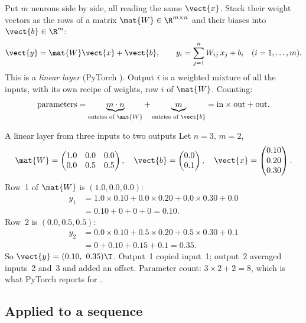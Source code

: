 Put $m$ neurons side by side, all reading the same $\vect{x}$. Stack their weight vectors as the rows
of a matrix $\mat{W}\in\R^{m\times n}$ and their biases into $\vect{b}\in\R^{m}$:
\begin{equation}\label{eq:shapes:linear}
\vect{y} = \mat{W}\vect{x} + \vect{b},\qquad
y_i = \sum_{j=1}^{n} W_{ij}\,x_j + b_i \quad (i = 1,\dots,m).
\end{equation}
This is a \emph{linear layer} (PyTorch ). Output $i$ is a
weighted mixture of all the inputs, with its own recipe of weights, row $i$ of $\mat{W}$. Counting:
\begin{equation}\label{eq:shapes:linearcount}
\text{parameters} = \underbrace{m\cdot n}_{\text{entries of } \mat{W}} + \underbrace{m}_{\text{entries of } \vect{b}}
= \text{in}\times\text{out} + \text{out}.
\end{equation}

\begin{worked}[label={we:shapes:linear}]{A linear layer from three inputs to two outputs}
Let $n=3$, $m=2$,
\[
\mat{W} = \begin{pmatrix}1.0 & 0.0 & 0.0\\ 0.0 & 0.5 & 0.5\end{pmatrix},\quad
\vect{b} = \begin{pmatrix}0.0\\0.1\end{pmatrix},\quad
\vect{x} = \begin{pmatrix}0.10\\0.20\\0.30\end{pmatrix}.
\]
Row~1 of $\mat{W}$ is $(1.0, 0.0, 0.0)$:
\begin{align*}
y_1 &= 1.0\times0.10 + 0.0\times0.20 + 0.0\times0.30 + 0.0\\
&= 0.10 + 0 + 0 + 0 = 0.10.
\end{align*}
Row~2 is $(0.0, 0.5, 0.5)$:
\begin{align*}
y_2 &= 0.0\times0.10 + 0.5\times0.20 + 0.5\times0.30 + 0.1\\
&= 0 + 0.10 + 0.15 + 0.1 = 0.35.
\end{align*}
So $\vect{y} = (0.10,\ 0.35)\T$. Output~1 copied input~1; output~2 averaged inputs~2 and~3 and added
an offset. Parameter count: $3\times2 + 2 = 8$, which is what PyTorch reports for
\tagC.
\end{worked}

\subsection{Applied to a sequence}

